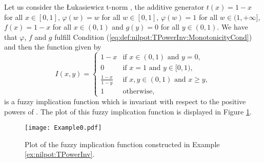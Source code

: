 \begin{example}\label{ex:nilpot:TPowerInv}
	Let us consider the Łukasiewicz t-norm \TLK, the additive generator $t(x)=1-x$ for all $x \in [0,1]$, $\varphi(w)=w$ for all $w \in [0,1]$, $\varphi(w)=1$ for all $ w \in (1,+\infty]$, $f(x)=1-x$ for all $x \in (0,1)$ and $g(y)=0$ for all $ y \in (0,1)$. We have that $\varphi$, $f$ and $g$ fulfill Condition (\ref{eq:def:nilpot:TPowerInv:MonotonicityCond}) and then the function given by
	$$
	I(x,y) =\left\{ \begin{array}{ll}
		1-x &   \text{if }   x \in (0,1) \text{ and } y=0, \\
		0 &  \text{if }  x = 1 \text{ and } y\in [0,1), \\
		\frac{1-x}{1-y} &  \text{if } x,y \in (0,1) \text{ and } x \geq y, \\
		1 & \text{otherwise,}
	\end{array}
	\right.
	$$
	is a fuzzy implication function which is invariant with respect to the positive powers of \TLK. The plot of this fuzzy implication function is displayed in Figure \ref{exfig:nilpot:TPowerInv}.
	\begin{figure}[!htp]
		\centering
		\texttt{[image: Example0.pdf]}
		\caption[Plot of an example of a nilpotent $T$-power invariant implication.]{Plot of the fuzzy implication function constructed in Example \ref{ex:nilpot:TPowerInv}.}\label{exfig:nilpot:TPowerInv}
	\end{figure}
\end{example}

